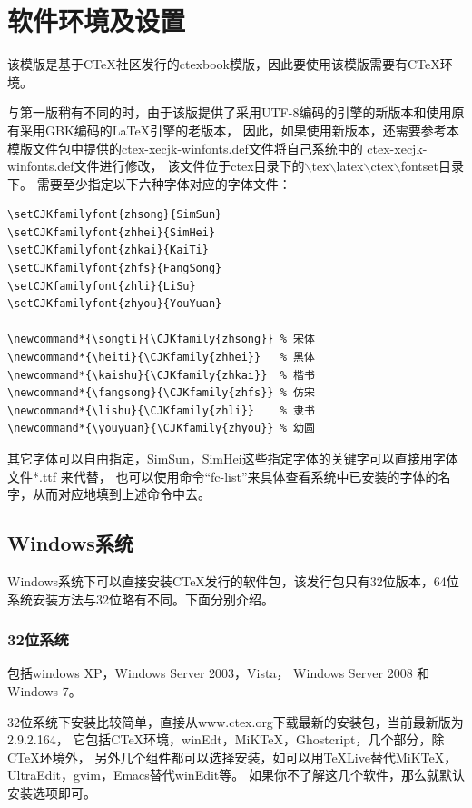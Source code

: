 \chapter{软件环境及设置}

该模版是基于CTeX社区发行的ctexbook模版，因此要使用该模版需要有CTeX环境。

与第一版稍有不同的时，由于该版提供了采用UTF-8编码的\XeTeX{}引擎的新版本和使用原有采用GBK编码的\LaTeX{}引擎的老版本，
因此，如果使用新版本，还需要参考本模版文件包中提供的ctex-xecjk-winfonts.def文件将自己系统中的
ctex-xecjk-winfonts.def文件进行修改，
该文件位于ctex目录下的$\backslash$tex$\backslash$latex$\backslash$ctex$\backslash$fontset目录下。
需要至少指定以下六种字体对应的字体文件：
\begin{verbatim}
\setCJKfamilyfont{zhsong}{SimSun}
\setCJKfamilyfont{zhhei}{SimHei}
\setCJKfamilyfont{zhkai}{KaiTi}
\setCJKfamilyfont{zhfs}{FangSong}
\setCJKfamilyfont{zhli}{LiSu}
\setCJKfamilyfont{zhyou}{YouYuan}

\newcommand*{\songti}{\CJKfamily{zhsong}} % 宋体
\newcommand*{\heiti}{\CJKfamily{zhhei}}   % 黑体
\newcommand*{\kaishu}{\CJKfamily{zhkai}}  % 楷书
\newcommand*{\fangsong}{\CJKfamily{zhfs}} % 仿宋
\newcommand*{\lishu}{\CJKfamily{zhli}}    % 隶书
\newcommand*{\youyuan}{\CJKfamily{zhyou}} % 幼圆
\end{verbatim}

其它字体可以自由指定，SimSun，SimHei这些指定字体的关键字可以直接用字体文件*.ttf 来代替，
也可以使用命令“fc-list”来具体查看系统中已安装的字体的名字，从而对应地填到上述命令中去。


\section{Windows系统}

Windows系统下可以直接安装CTeX发行的软件包，该发行包只有32位版本，64位系统安装方法与32位略有不同。下面分别介绍。

\subsection{32位系统}

包括windows XP，Windows Server 2003，Vista， Windows Server 2008 和 Windows 7。

32位系统下安装比较简单，直接从www.ctex.org下载最新的安装包，当前最新版为2.9.2.164，
它包括CTeX环境，winEdt，MiKTeX，Ghostcript，几个部分，除CTeX环境外，
另外几个组件都可以选择安装，如可以用TeXLive替代MiKTeX，UltraEdit，gvim，Emacs替代winEdit等。
如果你不了解这几个软件，那么就默认安装选项即可。

